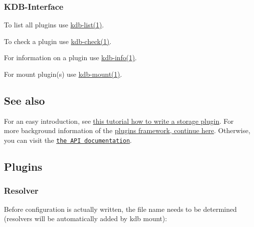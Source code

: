 \subsubsection*{K\+D\+B-\/\+Interface}


\begin{DoxyItemize}
\item To list all plugins use \hyperlink{doc_help_kdb-list_md}{kdb-\/list(1)}.
\item To check a plugin use \hyperlink{doc_help_kdb-check_md}{kdb-\/check(1)}.
\item For information on a plugin use \hyperlink{doc_help_kdb-info_md}{kdb-\/info(1)}.
\item For mount plugin(s) use \hyperlink{doc_help_kdb-mount_md}{kdb-\/mount(1)}.
\end{DoxyItemize}

\subsection*{See also}

For an easy introduction, see \hyperlink{doc_tutorials_plugins_md}{this tutorial how to write a storage plugin}. For more background information of the \hyperlink{doc_dev_plugins-framework_md}{plugins framework, continue here}. Otherwise, you can visit the \href{https://doc.libelektra.org/api/current/html/group__plugin.html}{\tt the A\+PI documentation}.

\subsection*{Plugins}

\subsubsection*{Resolver}

Before configuration is actually written, the file name needs to be determined (resolvers will be automatically added by kdb mount)\+:


